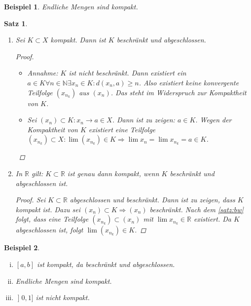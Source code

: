 \documentclass[ngerman,titlepage,twoside, parskip=half*]{scrreprt}
\newcommand*{\N}{\mathbb{N}}
\newcommand*{\R}{\mathbb{R}}
\theoremstyle{break}
\newtheorem{theorem}{Satz}[section]
\theoremstyle{nonumberbreak}
\newtheorem{beispiel}{Beispiel}
\newtheorem{proof}{Beweis:}
\newcommand*{\lsofint}[1]{\mathopen{]}#1]}   %
\begin{document}
\begin{beispiel}
  Endliche Mengen sind kompakt.
\end{beispiel}

\begin{theorem}\label{satz:beschr-abg}
  \begin{enumerate}[(1)]
  \item Sei $K\subset X$ kompakt. Dann ist $K$ beschränkt und
    abgeschlossen.
    \begin{proof}
      \begin{itemize}
      \item[Beschränkheit] Annahme: $K$ ist nicht beschränkt. Dann
        existiert ein $a \in K \forall n \in \N \exists x_n \in
        K\colon d(x_n,a)\geq n$. Also existiert keine konvergente
        Teilfolge $(x_{n_k})$ aus $(x_n)$. Das steht im Widerspruch
        zur Kompaktheit von $K$.
      \item[Abgeschlossenheit] Sei $(x_n)\subset K \colon x_n
        \rightarrow a\in X$. Dann ist zu zeigen: $a\in K$. Wegen der
        Kompaktheit von $K$ existiert eine Teilfolge $(x_{n_k})\subset
        X \colon\lim (x_{n_k})\in K\Rightarrow \lim x_n=\lim
        x_{n_k}=a\in K$.
      \end{itemize}
    \end{proof}
  \item In $\R$ gilt: $K\subset \R$ ist genau dann kompakt, wenn $K$
    beschränkt und abgeschlossen ist.
    \begin{proof}
      Sei $K\subset \R$ abgeschlossen und beschränkt. Dann ist zu
      zeigen, dass $K$ kompakt ist. Dazu sei  $(x_n)\subset K
      \Rightarrow (x_n)$ beschränkt. Nach dem \autoref{satz:bw} folgt,
      dass eine Teilfolge $(x_{n_k})\subset (x_n)$ mit  $\lim
      x_{n_k}\in\R$ existiert. Da $K$ abgeschlossen ist, folgt $\lim
      (x_{n_k})\in K$.
    \end{proof}
  \end{enumerate}
\end{theorem}

\begin{beispiel}
  \begin{enumerate}[(i)]
  \item $[a,b]$ ist kompakt, da beschränkt und abgeschlossen.
  \item Endliche Mengen sind kompakt.
  \item $\lsofint{0,1}$ ist nicht kompakt.
  \end{enumerate}  
\end{beispiel}
\end{document}

